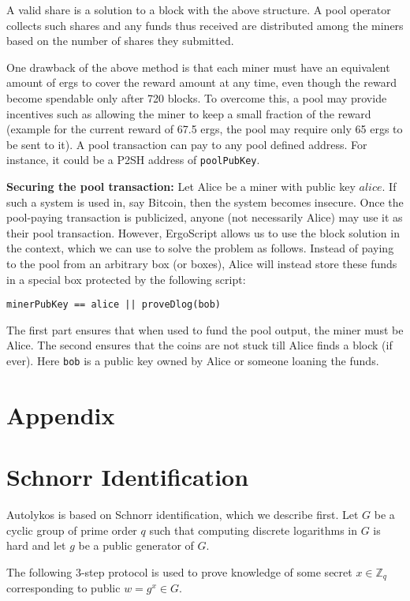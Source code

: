 \documentclass[runningheads]{llncs}
\newcommand{\langname}{ErgoScript\xspace}
\newcommand{\powname}{Autolykos\xspace}
\begin{document}
A valid share is a solution to a block with the above structure. A pool operator collects such shares and any funds thus received are distributed among the miners based on the number of shares they submitted.

One drawback of the above method is that each miner must have an equivalent amount of ergs to cover the reward amount at any time, even though the reward become spendable only after 720 blocks. To overcome this, a pool may provide incentives such as allowing the miner to keep a small fraction of the reward (example for the current reward of 67.5 ergs, the pool may require only 65 ergs to be sent to it). A pool transaction can pay to any pool defined address. For instance, it could be a P2SH address of \texttt{poolPubKey}. 

\textbf{Securing the pool transaction:} Let Alice be a miner with public key $alice$. If such a system is used in, say Bitcoin, then the system becomes insecure. Once the pool-paying transaction is publicized, anyone (not necessarily Alice) may use it as their pool transaction. 
However, \langname allows us to use the block solution in the context, which we can use to solve the problem as follows. Instead of paying to the pool from an arbitrary box (or boxes), Alice will instead store these funds in a special box protected by the following script:
\begin{verbatim}
minerPubKey == alice || proveDlog(bob)
\end{verbatim}
The first part ensures that when used to fund the pool output, the miner must be Alice. The second ensures that the coins are not stuck till Alice finds a block (if ever). Here \texttt{bob} is a public key owned by Alice or someone loaning the funds.
 



\appendix
\section*{Appendix}
\section{Schnorr Identification}
\label{schnorr}
\powname is based on Schnorr identification, which we describe first. Let $G$ be a cyclic group of prime order $q$ such that computing discrete logarithms in $G$ is hard and let $g$ be a public generator of $G$. 

The following 3-step protocol is used to prove knowledge of some secret $x\in\mathbb{Z}_q$ corresponding to public $w = g^x\in G$. 
\end{document}
